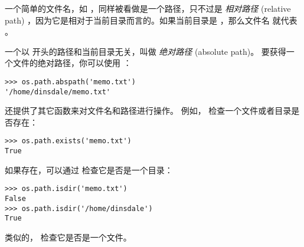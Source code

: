 {{{{{{{%

一个简单的文件名，如  ，同样被看做是一个路径，只不过是 {\em 相对路径} (relative path) ，因为它是相对于当前目录而言的。如果当前目录是  ，那么文件名  就代表  。

 
 


一个以 \li{/} 开头的路径和当前目录无关，叫做 {\em 绝对路径} (absolute path)。 要获得一个文件的绝对路径，你可以使用  ：

\begin{lstlisting}
>>> os.path.abspath('memo.txt')
'/home/dinsdale/memo.txt'
\end{lstlisting}

%

 还提供了其它函数来对文件名和路径进行操作。  例如， 检查一个文件或者目录是否存在：

  

\begin{lstlisting}
>>> os.path.exists('memo.txt')
True
\end{lstlisting}

%

如果存在，可以通过  检查它是否是一个目录：

\begin{lstlisting}
>>> os.path.isdir('memo.txt')
False
>>> os.path.isdir('/home/dinsdale')
True
\end{lstlisting}

%

类似的，  检查它是否是一个文件。

}}}}}}}
